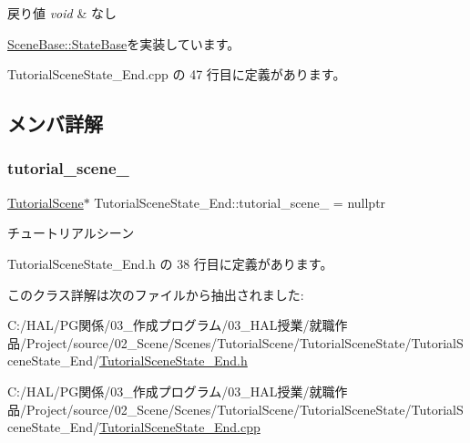 \begin{DoxyRetVals}{戻り値}
{\em void} & なし \\
\hline
\end{DoxyRetVals}


\mbox{\hyperlink{class_scene_base_1_1_state_base_ad2c6c8fd9f020eb02f64f394edee129c}{Scene\+Base\+::\+State\+Base}}を実装しています。



 Tutorial\+Scene\+State\+\_\+\+End.\+cpp の 47 行目に定義があります。



\subsection{メンバ詳解}
\mbox{\label{class_tutorial_scene_state___end_a68f36e80b530182a5b5d835425b7e829}} 
\subsubsection{\texorpdfstring{tutorial\+\_\+scene\+\_\+}{tutorial\_scene\_}}
{\footnotesize\ttfamily \mbox{\hyperlink{class_tutorial_scene}{Tutorial\+Scene}}$\ast$ Tutorial\+Scene\+State\+\_\+\+End\+::tutorial\+\_\+scene\+\_\+ = nullptr\hspace{0.3cm}{\ttfamily [private]}}



チュートリアルシーン 



 Tutorial\+Scene\+State\+\_\+\+End.\+h の 38 行目に定義があります。



このクラス詳解は次のファイルから抽出されました\+:\begin{DoxyCompactItemize}
\item 
C\+:/\+H\+A\+L/\+P\+G関係/03\+\_\+作成プログラム/03\+\_\+\+H\+A\+L授業/就職作品/\+Project/source/02\+\_\+\+Scene/\+Scenes/\+Tutorial\+Scene/\+Tutorial\+Scene\+State/\+Tutorial\+Scene\+State\+\_\+\+End/\mbox{\hyperlink{_tutorial_scene_state___end_8h}{Tutorial\+Scene\+State\+\_\+\+End.\+h}}\item 
C\+:/\+H\+A\+L/\+P\+G関係/03\+\_\+作成プログラム/03\+\_\+\+H\+A\+L授業/就職作品/\+Project/source/02\+\_\+\+Scene/\+Scenes/\+Tutorial\+Scene/\+Tutorial\+Scene\+State/\+Tutorial\+Scene\+State\+\_\+\+End/\mbox{\hyperlink{_tutorial_scene_state___end_8cpp}{Tutorial\+Scene\+State\+\_\+\+End.\+cpp}}\end{DoxyCompactItemize}
